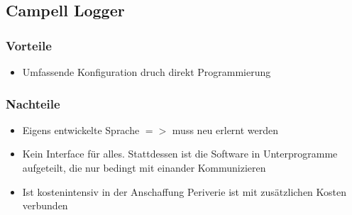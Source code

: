 \subsection{Campell Logger}

\subsubsection{Vorteile}
\begin{itemize}
 \item Umfassende Konfiguration druch direkt Programmierung
\end{itemize}


\subsubsection{Nachteile}
\begin{itemize}
 \item Eigens entwickelte Sprache $=>$ muss neu erlernt werden
 \item Kein Interface für alles.
 \subitem Stattdessen ist die Software in Unterprogramme aufgeteilt, die nur 
bedingt mit einander Kommunizieren
 \item Ist kostenintensiv in der Anschaffung
 \subitem Periverie ist mit zusätzlichen Kosten verbunden
\end{itemize}


